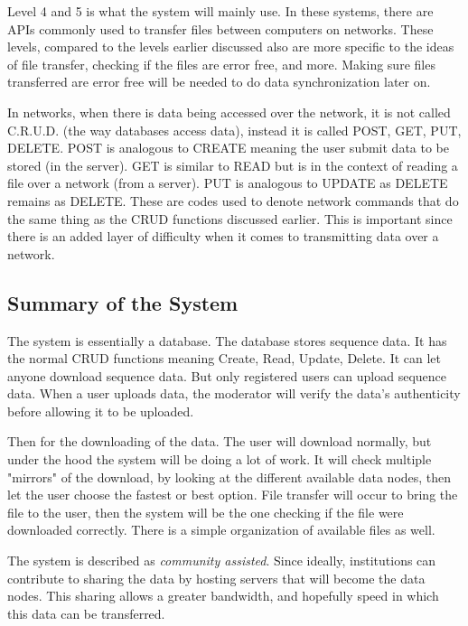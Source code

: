 \documentclass[acmsmall]{acmart}
\begin{document}
Level 4 and 5 is what the system will mainly use. In these systems, there are APIs commonly used to transfer files between computers on networks. These levels, compared to the levels earlier discussed also are more specific to the ideas of file transfer, checking if the files are error free, and more. Making sure files transferred are error free will be needed to do data synchronization later on.

In networks, when there is data being accessed over the network, it is not called C.R.U.D. (the way databases access data), instead it is called POST, GET, PUT, DELETE. POST is analogous to CREATE meaning the user submit data to be stored (in the server). GET is similar to READ but is in the context of reading a file over a network (from a server). PUT is analogous to UPDATE as DELETE remains as DELETE. These are codes used to denote network commands that do the same thing as the CRUD functions discussed earlier. This is important since there is an added layer of difficulty when it comes to transmitting data over a network.


\subsection{Summary of the System}

The system is essentially a database. The database stores sequence data. It has the normal CRUD functions meaning Create, Read, Update, Delete. It can let anyone download sequence data. But only registered users can upload sequence data. When a user uploads data, the moderator will verify the data's authenticity before allowing it to be uploaded. 

Then for the downloading of the data. The user will download normally, but under the hood the system will be doing a lot of work. It will check multiple "mirrors" of the download, by looking at the different available data nodes, then let the user choose the fastest or best option. File transfer will occur to bring the file to the user, then the system will be the one checking if the file were downloaded correctly. There is a simple organization of available files as well.

The system is described as \textit{community assisted}. Since ideally, institutions can contribute to sharing the data by hosting servers that will become the data nodes. This sharing allows a greater bandwidth, and hopefully speed in which this data can be transferred. 
\end{document}
